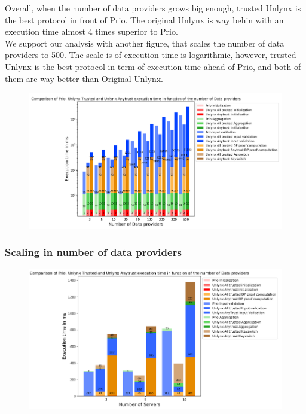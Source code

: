 \documentclass{article}
\begin{document}
Overall, when the number of data providers grows big enough, trusted Unlynx is the best protocol in front of Prio. The original Unlynx is way behin with an execution time almost 4 times superior to Prio.\\
We support our analysis with another figure, that scales the number of data providers to 500. The scale is of execution time is logarithmic, however, trusted Unlynx is the best protocol in term of execution time ahead of Prio, and both of them are way better than Original Unlynx.

\begin{figure}[H]
\centering
\includegraphics[scale=0.7]{img/ComparisonDP.png}
\end{figure}
 

\subsubsection{Scaling in number of data providers}

\begin{figure}[H]
\centering
\includegraphics[scale=0.7]{img/ComparisonlinearServer.png}
\end{figure}
\end{document}
